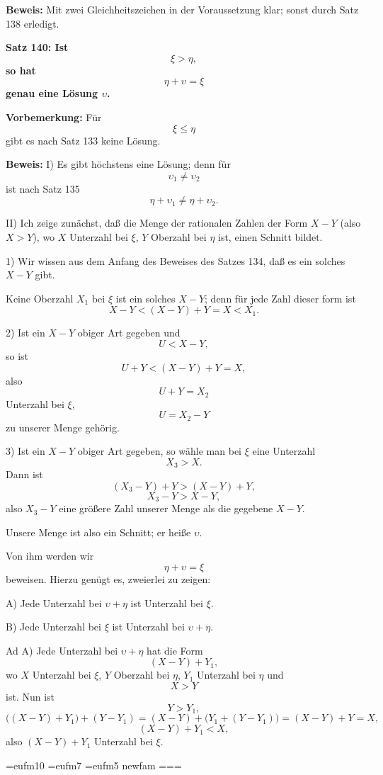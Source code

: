 {\bf Beweis:} Mit zwei Gleichheitszeichen in der Voraussetzung
klar; sonst durch Satz 138 erledigt.
\medskip


{\bf Satz 140: Ist
$$\xi > \eta,$$
so hat
$$\eta + \upsilon = \xi$$
genau eine L\"osung $\upsilon$.}

{\bf Vorbemerkung:} F\"ur
$$\xi \le \eta$$
gibt es nach Satz 133 keine L\"osung.

{\bf Beweis:} I) Es gibt h\"ochstens eine L\"osung; denn f\"ur
$$\upsilon_1 \ne \upsilon_2$$
ist nach Satz 135
$$\eta + \upsilon_1 \ne \eta + \upsilon_2.$$

II) Ich zeige zun\"achst, da{\ss} die Menge der rationalen Zahlen
der Form $X - Y$ (also $X > Y$), wo $X$ Unterzahl bei $\xi$, $Y$ Oberzahl
bei $\eta$ ist, einen Schnitt bildet.

1) Wir wissen aus dem Anfang des Beweises des Satzes 134,
da{\ss} es ein solches $X - Y$ gibt.

Keine Oberzahl $X_1$ bei $\xi$ ist ein solches $X - Y$; denn f\"ur jede
Zahl dieser form ist
$$X - Y < (X - Y) + Y = X < X_1.$$

2) Ist ein $X - Y$ obiger Art gegeben und
$$U < X - Y,$$
so ist
$$U + Y < (X - Y) + Y = X,$$
also
$$U + Y = X_2$$
Unterzahl bei $\xi$,
$$U = X_2 - Y$$
zu unserer Menge geh\"orig.

3) Ist ein $X - Y$ obiger Art gegeben, so w\"ahle man bei $\xi$ eine
Unterzahl
$$X_3 > X.$$
Dann ist
$$(X_3 - Y) + Y > (X - Y) + Y,$$
$$X_3 - Y > X - Y,$$
also $X_3 - Y$ eine gr\"o{\ss}ere Zahl unserer Menge als die gegebene
$X - Y$.

Unsere Menge ist also ein Schnitt; er hei{\ss}e $\upsilon$.

Von ihm werden wir
$$\eta + \upsilon = \xi$$
beweisen. Hierzu gen\"ugt es, zweierlei zu zeigen:

A) Jede Unterzahl bei $\upsilon + \eta$ ist Unterzahl bei $\xi$.

B) Jede Unterzahl bei $\xi$ ist Unterzahl bei $\upsilon + \eta$.

Ad A) Jede Unterzahl bei $\upsilon + \eta$ hat die Form
$$(X - Y) + Y_1,$$
wo $X$ Unterzahl bei $\xi$, $Y$ Oberzahl bei $\eta$, $Y_1$ Unterzahl bei $\eta$ und
$$X > Y$$
ist.  Nun ist
$$Y > Y_1,$$
$$\bigl((X - Y) + Y_1\bigr) + (Y - Y_1) = (X - Y) + \bigl(Y_1 + (Y - Y_1)\bigr) = (X - Y) + Y = X,$$
$$(X - Y) + Y_1 < X,$$
also $(X - Y) + Y_1$ Unterzahl bei $\xi$.

\ifx\fr\undefined
  \font\teneufm=eufm10 \font\seveneufm=eufm7 \font\fiveeufm=eufm5
  \csname newfam\endcsname\eufmfam
  \textfont\eufmfam=\teneufm \scriptfont\eufmfam=\seveneufm \scriptscriptfont\eufmfam=\fiveeufm
  \def\fr{\fam\eufmfam}
\fi

